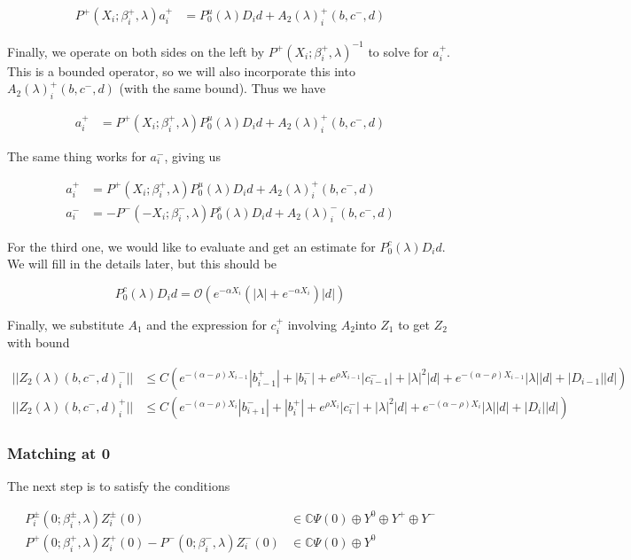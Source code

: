 \documentclass[12pt]{article}
\def\C{{\mathbb C}}
\begin{document}
\begin{align*}
P^+(X_i; \beta_i^+, \lambda)a_i^+ &= P_0^u(\lambda) D_i d + A_2(\lambda)_i^+(b, c^-, d)
\end{align*}

Finally, we operate on both sides on the left by $P^+(X_i; \beta_i^+, \lambda)^{-1}$ to solve for $a_i^+$. This is a bounded operator, so we will also incorporate this into $A_2(\lambda)_i^+(b, c^-, d)$ (with the same bound). Thus we have

\begin{align*}
a_i^+ &= P^+(X_i; \beta_i^+, \lambda) P_0^u(\lambda) D_i d + A_2(\lambda)_i^+(b, c^-, d)
\end{align*}

The same thing works for $a_i^-$, giving us

\begin{align*}
a_i^+ &= P^+(X_i; \beta_i^+, \lambda) P_0^u(\lambda) D_i d + A_2(\lambda)_i^+(b, c^-, d) \\
a_i^- &= -P^-(-X_i; \beta_i^-, \lambda) P_0^s(\lambda) D_i d + A_2(\lambda)_i^-(b, c^-, d)
\end{align*}

For the third one, we would like to evaluate and get an estimate for $P_0^c(\lambda) D_i d$. We will fill in the details later, but this should be

\[
P_0^c(\lambda) D_i d = \mathcal{O}(e^{-\alpha X_i}(|\lambda| + e^{-\alpha X_i})|d|)
\]

Finally, we substitute $A_1$ and the expression for $c_i^+$ involving $A_2$into $Z_1$ to get $Z_2$ with bound

\begin{align*}
||Z_2(\lambda)(b,c^-,d)_i^-|| &\leq C ( e^{-(\alpha - \rho) X_{i-1}} |b_{i-1}^+| + |b_i^-| + e^{\rho X_{i-1}}|c_{i-1}^-| + |\lambda|^2 |d| + e^{-(\alpha - \rho)X_{i-1}}|\lambda||d| + |D_{i-1}||d| ) \\
||Z_2(\lambda)(b,c^-,d)_i^+|| &\leq C ( e^{-(\alpha - \rho) X_i}|b_{i+1}^-| + |b_i^+| + e^{\rho X_i} |c_i^-| + |\lambda|^2 |d| + e^{-(\alpha - \rho)X_i}|\lambda||d| + |D_i||d| )
\end{align*}

\subsubsection*{Matching at 0}

The next step is to satisfy the conditions

\begin{align*}
P_i^\pm(0; \beta_i^\pm, \lambda) Z_i^\pm(0) &\in \C \Psi(0) \oplus Y^0 \oplus Y^+ \oplus Y^- \\
P^+(0; \beta_i^+, \lambda) Z_i^+(0) - P^-(0; \beta_i^-, \lambda) Z_i^-(0) &\in \C \Psi(0) \oplus Y^0
\end{align*}
\end{document}
